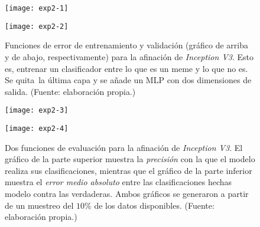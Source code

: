 \begin{figure}[h]
  \begin{minipage}[c]{\linewidth}
    \texttt{[image: exp2-1]}
  \end{minipage}\hfill
  \begin{minipage}[c]{\linewidth}
    \texttt{[image: exp2-2]}
  \end{minipage}
  \caption{
    Funciones de error de entrenamiento y validación (gráfico de arriba y de abajo,
    respectivamente) para la afinación de \emph{Inception V3}.
    Esto es, entrenar un clasificador entre lo que es un meme y lo que no es. Se quita\
    la última capa y se añade un MLP con dos dimensiones de salida.
    (Fuente: elaboración propia.)
  }
  \label{exp2}
\end{figure}

\begin{figure}[H]
  \centering
  \begin{minipage}[c]{\linewidth}
    \texttt{[image: exp2-3]}
  \end{minipage}\hfill
  \begin{minipage}[c]{\linewidth}
    \texttt{[image: exp2-4]}
  \end{minipage}
  \caption{
    Dos funciones de evaluación para la afinación de \emph{Inception V3}.
    El gráfico de la parte superior muestra la \emph{precisión} con la que el modelo realiza
    sus clasificaciones, mientras que el gráfico de la parte inferior muestra el
    \emph{error medio absoluto} entre las clasificaciones hechas modelo contra las verdaderas.
    Ambos gráficos se generaron a partir de un muestreo del $10\%$ de los datos disponibles.
    (Fuente: elaboración propia.)
  }
  \label{eval:exp2}
\end{figure}

